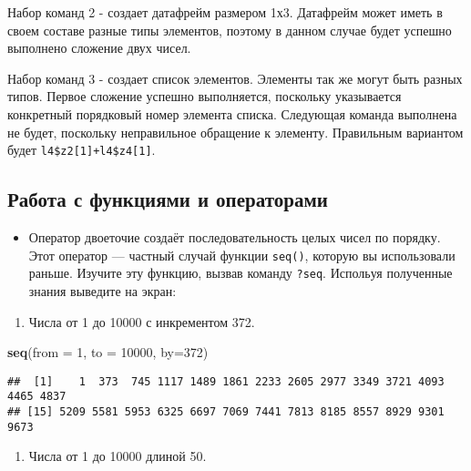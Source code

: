 \documentclass[]{article}
\newenvironment{Shaded}{\begin{snugshade}}{\end{snugshade}}
\newcommand{\KeywordTok}[1]{\textcolor[rgb]{0.13,0.29,0.53}{\textbf{#1}}}
\newcommand{\DataTypeTok}[1]{\textcolor[rgb]{0.13,0.29,0.53}{#1}}
\newcommand{\DecValTok}[1]{\textcolor[rgb]{0.00,0.00,0.81}{#1}}
\newcommand{\NormalTok}[1]{#1}
\providecommand{\tightlist}{%
  \setlength{\itemsep}{0pt}\setlength{\parskip}{0pt}}
\begin{document}
Набор команд 2 - создает датафрейм размером 1х3. Датафрейм может иметь в
своем составе разные типы элементов, поэтому в данном случае будет
успешно выполнено сложение двух чисел.

Набор команд 3 - создает список элементов. Элементы так же могут быть
разных типов. Первое сложение успешно выполняется, поскольку указывается
конкретный порядковый номер элемента списка. Следующая команда выполнена
не будет, поскольку неправильное обращение к элементу. Правильным
вариантом будет \texttt{l4\$z2{[}1{]}+l4\$z4{[}1{]}}.

\subsection{Работа с функциями и операторами}\label{----}

\begin{itemize}
\tightlist
\item
  Оператор двоеточие создаёт последовательность целых чисел по порядку.
  Этот оператор --- частный случай функции \texttt{seq()}, которую вы
  использовали раньше. Изучите эту функцию, вызвав команду
  \texttt{?seq}. Испольуя полученные знания выведите на экран:
\end{itemize}

\begin{enumerate}
\def\labelenumi{\arabic{enumi}.}
\tightlist
\item
  Числа от 1 до 10000 с инкрементом 372.
\end{enumerate}

\begin{Shaded}
\begin{Highlighting}[]
\KeywordTok{seq}\NormalTok{(}\DataTypeTok{from =} \DecValTok{1}\NormalTok{, }\DataTypeTok{to =} \DecValTok{10000}\NormalTok{, }\DataTypeTok{by=}\DecValTok{372}\NormalTok{)}
\end{Highlighting}
\end{Shaded}

\begin{verbatim}
##  [1]    1  373  745 1117 1489 1861 2233 2605 2977 3349 3721 4093 4465 4837
## [15] 5209 5581 5953 6325 6697 7069 7441 7813 8185 8557 8929 9301 9673
\end{verbatim}

\begin{enumerate}
\def\labelenumi{\arabic{enumi}.}
\setcounter{enumi}{1}
\tightlist
\item
  Числа от 1 до 10000 длиной 50.
\end{enumerate}
\end{document}
